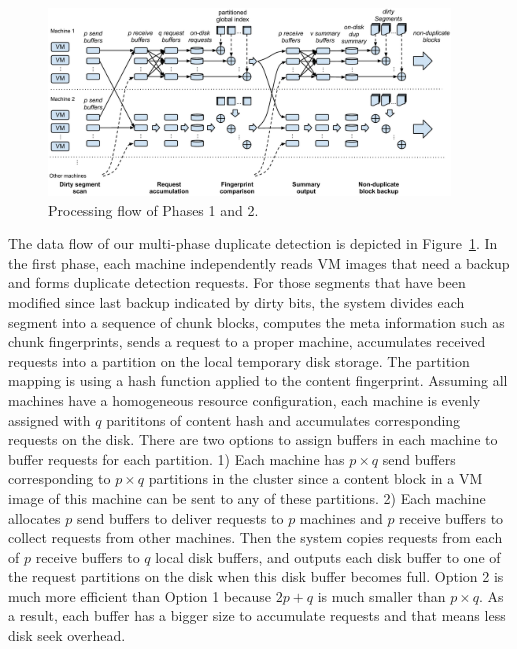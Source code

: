 \begin{figure}[tbhp]
\centering
\includegraphics[width=0.95\textwidth]{steps.pdf}
\caption{Processing flow of Phases 1  and 2.}
\label{fig:flow}
\end{figure}

The data flow of our multi-phase duplicate detection is depicted in Figure~\ref{fig:flow}. 
In the first phase, each machine independently reads  
VM images that need a backup
and forms duplicate  detection requests. For those segments that have been modified since last backup indicated by 
dirty bits,  the system divides  each segment into a sequence of chunk blocks,  computes the meta 
information such as chunk fingerprints,  sends a request to a proper machine, accumulates  
received requests into a partition on the local temporary disk storage. 
The partition mapping is using a hash function applied to the content fingerprint. 
Assuming all machines have a  homogeneous resource configuration, each machine is evenly  assigned with
$q$ parititons of content hash and accumulates corresponding requests on the disk. 
There are two options to assign buffers in each machine to buffer requests for each partition.
1) Each machine has  $p\times q$ send buffers corresponding to $p\times q$ partitions in the cluster
since a content block in a VM image of this machine can be sent to any of these partitions.
2) Each machine allocates $p$ send buffers to deliver requests to $p$ machines and 
$p$ receive buffers to collect requests  from other machines.
Then the system copies requests from each of $p$ receive buffers to  $q$ local disk buffers,
and outputs each disk buffer to one of the request partitions on the disk
when this disk buffer becomes full.  Option 2 is much more efficient than Option 1 because $2p+q$ is much smaller than
$p\times q$. As a result, each buffer has a bigger size to accumulate requests and that means
less disk seek overhead.

